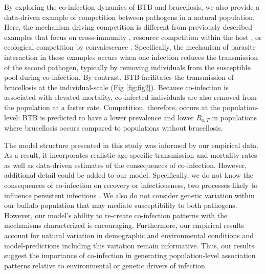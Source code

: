 \documentclass[10pt,letterpaper]{article}
\begin{document}
By exploring the co-infection dynamics of BTB and brucellosis, we also provide a data-driven example of competition between pathogens in a natural population. Here, the mechanism driving competition is different from previously described examples that focus on cross-immunity \cite{bhattacharyya_cross-immunity_2015}, resource competition within the host \cite{graham_ecological_2008}, or ecological competition by convalescence \cite{rohani_population_1998, rohani_ecological_2003}. Specifically, the mechanism of parasite interaction in these examples occurs when one infection reduces the transmission of the second pathogen, typically by removing individuals from the susceptible pool during co-infection. By contrast, BTB facilitates the transmission of brucellosis at the individual-scale (Fig \ref{fig:fig2}). Because co-infection is associated with elevated mortality, co-infected individuals are also removed from the population at a faster rate. Competition, therefore, occurs at the population-level: BTB is predicted to have a lower prevalence and lower $R_{o,T}$ in populations where brucellosis occurs compared to populations without brucellosis.

The model structure presented in this study was informed by our empirical data. As a result, it incorporates realistic age-specific transmission and mortality rates as well as data-driven estimates of the consequences of co-infection. However, additional detail could be added to our model. Specifically, we do not know the consequences of co-infection on recovery or infectiousness, two processes likely to influence persistent infections \cite{huang_dynamical_2005, lloyd-smith_hiv-1/parasite_2008}. We also do not consider genetic variation within our buffalo population that may mediate susceptibility to both pathogens. However, our model’s ability to re-create co-infection patterns with the mechanisms characterized is encouraging. Furthermore, our empirical results account for natural variation in demographic and environmental conditions and model-predictions including this variation remain informative. Thus, our results suggest the importance of co-infection in generating population-level association patterns relative to environmental or genetic drivers of infection.
\end{document}
